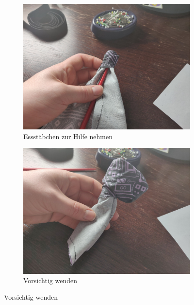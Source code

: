 \documentclass[12pt,parskip=full]{scrartcl}
\begin{document}
\begin{figure}[ht]
    \vspace{0.5cm}
    \centering
    \begin{subfigure}{0.48\textwidth}
        \centering
        \includegraphics[width = \linewidth]{Pictures/07_Turning/Turning3_resized.jpg}
        \caption{Essstäbchen zur Hilfe nehmen}
        \label{Turning3}
    \end{subfigure}
    \begin{subfigure}{0.48\textwidth}
        \centering
        \includegraphics[width = \linewidth]{Pictures/07_Turning/Turning4_resized.jpg}
        \caption{Vorsichtig wenden}
        \label{Turning4}
    \end{subfigure}

\end{figure}
\end{document}
